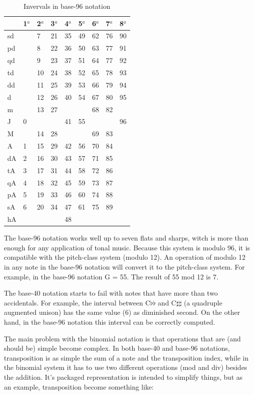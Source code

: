 \documentclass{article}
\begin{document}
\begin{table}
  \centering
  \begin{tabular}{l|llllllll}
    & 1$^{a}$& 2$^{a}$& 3$^{a}$& 4$^{a}$& 5$^{a}$& 6$^{a}$& 7$^{a}$& 8$^{a}$ \\
    \hline
    sd  &  & 7&21&35&49&62&76&90 \\
    pd  &  & 8&22&36&50&63&77&91 \\
    qd  &  & 9&23&37&51&64&77&92 \\
    td  &  &10&24&38&52&65&78&93 \\
    dd  &  &11&25&39&53&66&79&94 \\
    d   &  &12&26&40&54&67&80&95 \\
    m   &  &13&27&  &  &68&82&   \\
    J   & 0&  &  &41&55&  &  &96 \\
    M   &  &14&28&  &  &69&83&   \\
    A   & 1&15&29&42&56&70&84&   \\
    dA  & 2&16&30&43&57&71&85&   \\
    tA  & 3&17&31&44&58&72&86&   \\
    qA  & 4&18&32&45&59&73&87&   \\
    pA  & 5&19&33&46&60&74&88&   \\
    sA  & 6&20&34&47&61&75&89&   \\
    hA  &  &  &  &48&  &  &  &   
  \end{tabular}
  \caption{Invervals in base-96 notation}
  \label{tab:jama-intervalos}
\end{table}

The base-96 notation works well up to seven flats and sharps, witch is
more than enough for any application of tonal music. Because this
system is modulo 96, it is compatible with the pitch-class system
(modulo 12). An operation of modulo 12 in any note in the base-96
notation will convert it to the pitch-class system. For example, in
the base-96 notation G = 55. The result of 55 mod 12 is 7.

The base-40 notation starts to fail with notes that have more than two
accidentals. For example, the interval between C$\flat\flat$ and
C$\sharp\sharp$ (a quadruple augmented unison) has the same value (6)
as diminished second. On the other hand, in the base-96 notation this
interval can be correctly computed.

The main problem with the binomial notation is that operations that
are (and should be) simple become complex. In both base-40 and base-96
notations, transposition is as simple the sum of a note and the
transposition index, while in the binomial system it has to use two
different operations (mod and div) besides the addition. It's packaged
representation is intended to simplify things, but as an example,
transposition become something like:
\end{document}
